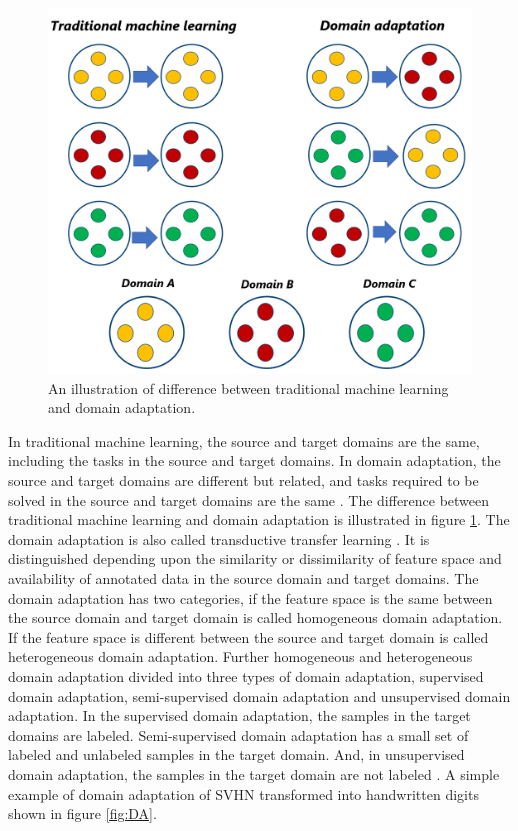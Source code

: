 \begin{figure}[H]
        \begin{center}
	 	    \includegraphics[scale=0.28]{images/Introduction/DomainAdaptation.png}
	    \caption[An illustration of difference between traditional machine learning and domain adaptation.]{An illustration of difference between traditional machine learning and domain adaptation.}
	    \label{fig:DomainAdaptation}
	    \end{center}
\end{figure}

In traditional machine learning, the source and target domains are the same, including the tasks in the source and target domains. In domain adaptation, the source and target domains are different but related, and tasks required to be solved in the source and target domains are the same \cite{5288526}. The difference between traditional machine learning and domain adaptation is illustrated in figure \ref{fig:DomainAdaptation}. The domain adaptation is also called transductive transfer learning \cite{5288526}. It is distinguished depending upon the similarity or dissimilarity of feature space and availability of annotated data in the source domain and target domains. The domain adaptation has two categories, if the feature space is the same between the source domain and target domain is called homogeneous domain adaptation. If the feature space is different between the source and target domain is called heterogeneous domain adaptation. Further homogeneous and heterogeneous domain adaptation divided into three types of domain adaptation, supervised domain adaptation, semi-supervised domain adaptation and unsupervised domain adaptation. In the supervised domain adaptation, the samples in the target domains are labeled. Semi-supervised domain adaptation has a small set of labeled and unlabeled samples in the target domain. And, in unsupervised domain adaptation, the samples in the target domain are not labeled \cite{5288526}. A simple example of domain adaptation of  \ac{SVHN} transformed into handwritten digits shown in figure \ref{fig:DA}.



